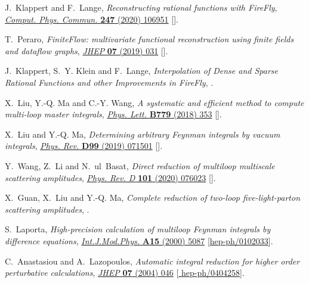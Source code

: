 \documentclass[11pt,a4paper,DIV=11,numbers=noenddot,parskip=half]{scrartcl}
\begin{document}
\begin{thebibliography}{10}
J.~Klappert and F.~Lange, \emph{{Reconstructing rational functions with
  FireFly}}, \href{https://doi.org/10.1016/j.cpc.2019.106951}{\emph{Comput.
  Phys. Commun.} {\bfseries 247} (2020) 106951}
  [\href{https://arxiv.org/abs/1904.00009}{{}}].

T.~Peraro, \emph{{FiniteFlow: multivariate functional reconstruction using
  finite fields and dataflow graphs}},
  \href{https://doi.org/10.1007/JHEP07(2019)031}{\emph{JHEP} {\bfseries 07}
  (2019) 031} [\href{https://arxiv.org/abs/1905.08019}{{}}].

J.~Klappert, S.~Y. Klein and F.~Lange, \emph{{Interpolation of Dense and Sparse
  Rational Functions and other Improvements in FireFly}},
  \href{https://arxiv.org/abs/2004.01463}{{}}.

X.~Liu, Y.-Q. Ma and C.-Y. Wang, \emph{{A systematic and efficient method to
  compute multi-loop master integrals}},
  \href{https://doi.org/10.1016/j.physletb.2018.02.026}{\emph{Phys. Lett.}
  {\bfseries B779} (2018) 353}
  [\href{https://arxiv.org/abs/1711.09572}{{}}].

X.~Liu and Y.-Q. Ma, \emph{{Determining arbitrary Feynman integrals by vacuum
  integrals}}, \href{https://doi.org/10.1103/PhysRevD.99.071501}{\emph{Phys.
  Rev.} {\bfseries D99} (2019) 071501}
  [\href{https://arxiv.org/abs/1801.10523}{{}}].

Y.~Wang, Z.~Li and N.~ul~Basat, \emph{{Direct reduction of multiloop multiscale
  scattering amplitudes}},
  \href{https://doi.org/10.1103/PhysRevD.101.076023}{\emph{Phys. Rev. D}
  {\bfseries 101} (2020) 076023}
  [\href{https://arxiv.org/abs/1901.09390}{{}}].

X.~Guan, X.~Liu and Y.-Q. Ma, \emph{{Complete reduction of two-loop
  five-light-parton scattering amplitudes}},
  \href{https://arxiv.org/abs/1912.09294}{{}}.

S.~Laporta, \emph{{High-precision calculation of multiloop Feynman integrals by
  difference equations}},
  \href{https://doi.org/10.1016/S0217-751X(00)00215-7}{\emph{Int.J.Mod.Phys.}
  {\bfseries A15} (2000) 5087}
  [\href{https://arxiv.org/abs/hep-ph/0102033}{{\ttfamily hep-ph/0102033}}].

C.~Anastasiou and A.~Lazopoulos, \emph{{Automatic integral reduction for higher
  order perturbative calculations}},
  \href{https://doi.org/10.1088/1126-6708/2004/07/046}{\emph{JHEP} {\bfseries
  07} (2004) 046} [\href{https://arxiv.org/abs/hep-ph/0404258}{{\ttfamily
  hep-ph/0404258}}].


\end{thebibliography}
\end{document}
